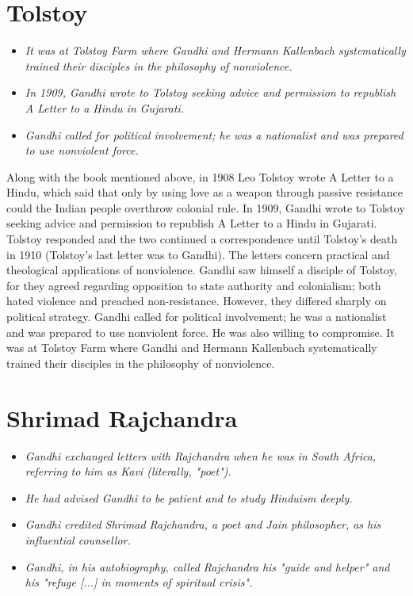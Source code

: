 \section{Tolstoy}\label{tolstoy}

\begin{itemize}
\item
  \emph{It was at Tolstoy Farm where Gandhi and Hermann Kallenbach
  systematically trained their disciples in the philosophy of
  nonviolence.}
\item
  \emph{In 1909, Gandhi wrote to Tolstoy seeking advice and permission
  to republish A Letter to a Hindu in Gujarati.}
\item
  \emph{Gandhi called for political involvement; he was a nationalist
  and was prepared to use nonviolent force.}
\end{itemize}

Along with the book mentioned above, in 1908 Leo Tolstoy wrote A Letter
to a Hindu, which said that only by using love as a weapon through
passive resistance could the Indian people overthrow colonial rule. In
1909, Gandhi wrote to Tolstoy seeking advice and permission to republish
A Letter to a Hindu in Gujarati. Tolstoy responded and the two continued
a correspondence until Tolstoy's death in 1910 (Tolstoy's last letter
was to Gandhi). The letters concern practical and theological
applications of nonviolence. Gandhi saw himself a disciple of Tolstoy,
for they agreed regarding opposition to state authority and colonialism;
both hated violence and preached non-resistance. However, they differed
sharply on political strategy. Gandhi called for political involvement;
he was a nationalist and was prepared to use nonviolent force. He was
also willing to compromise. It was at Tolstoy Farm where Gandhi and
Hermann Kallenbach systematically trained their disciples in the
philosophy of nonviolence.

\section{Shrimad Rajchandra}\label{shrimad-rajchandra}

\begin{itemize}
\item
  \emph{Gandhi exchanged letters with Rajchandra when he was in South
  Africa, referring to him as Kavi (literally, "poet").}
\item
  \emph{He had advised Gandhi to be patient and to study Hinduism
  deeply.}
\item
  \emph{Gandhi credited Shrimad Rajchandra, a poet and Jain philosopher,
  as his influential counsellor.}
\item
  \emph{Gandhi, in his autobiography, called Rajchandra his "guide and
  helper" and his "refuge {[}...{]} in moments of spiritual crisis".}
\end{itemize}

